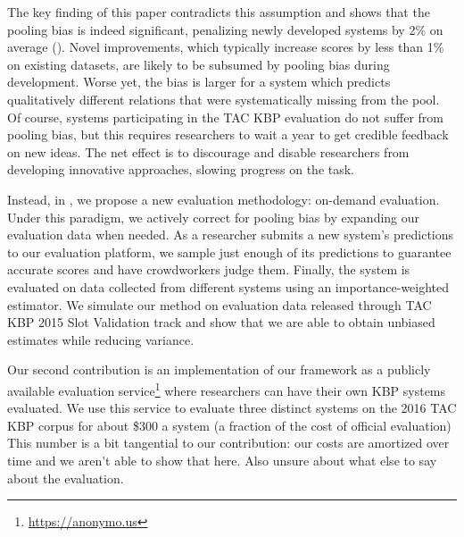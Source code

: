 The key finding of this paper contradicts this assumption and shows that the pooling bias is indeed significant, penalizing newly developed systems by 2\% \fone{} on average (). 
Novel improvements, which typically increase scores by less than 1\% \fone{} on existing datasets, are likely to be subsumed by pooling bias during development. 
Worse yet, the bias is larger for a system which predicts qualitatively different relations that were systematically missing from the pool.
Of course, systems participating in the TAC KBP evaluation do not suffer from pooling bias, but this requires researchers to wait a year to get credible feedback on new ideas.
The net effect is to discourage and disable researchers from developing innovative approaches, slowing progress on the task.

Instead, in , we propose a new evaluation methodology: on-demand evaluation.
Under this paradigm, we actively correct for pooling bias by expanding our evaluation data when needed.
As a researcher submits a new system's predictions to our evaluation platform, we sample just enough of its predictions to guarantee accurate scores and have crowdworkers judge them.
Finally, the system is evaluated on data collected from different systems using an importance-weighted estimator.
We simulate our method on evaluation data released through TAC KBP 2015 Slot Validation track and show that we are able to obtain unbiased estimates while reducing variance.

Our second contribution is an implementation of our framework as a publicly available evaluation service\footnote{\url{https://anonymo.us}} where researchers can have their own KBP systems evaluated.
We use this service to evaluate three distinct systems on the 2016 TAC KBP corpus for about \$300 a system (a fraction of the cost of official evaluation) \ac{This number is a bit tangential to our contribution: our costs are amortized over time and we aren't able to show that here}. \ac{Also unsure about what else to say about the evaluation.}

